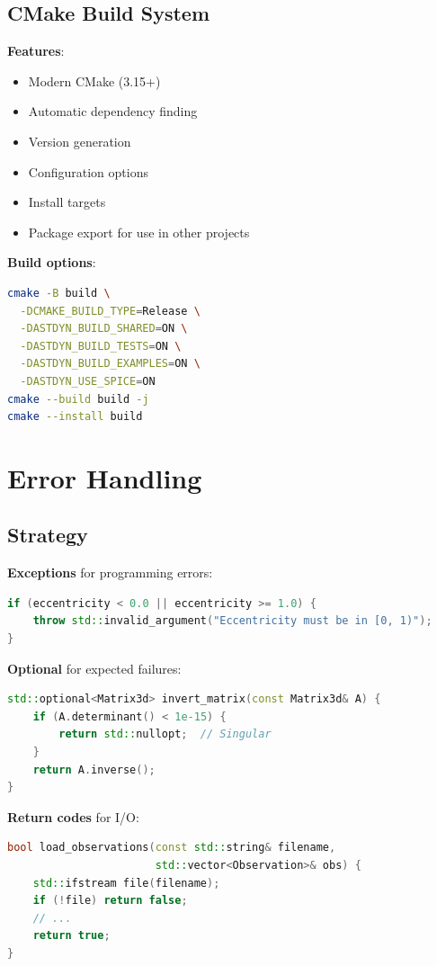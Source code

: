 \subsection{CMake Build System}

\textbf{Features}:
\begin{itemize}
    \item Modern CMake (3.15+)
    \item Automatic dependency finding
    \item Version generation
    \item Configuration options
    \item Install targets
    \item Package export for use in other projects
\end{itemize}

\textbf{Build options}:
\begin{lstlisting}[language=bash]
cmake -B build \
  -DCMAKE_BUILD_TYPE=Release \
  -DASTDYN_BUILD_SHARED=ON \
  -DASTDYN_BUILD_TESTS=ON \
  -DASTDYN_BUILD_EXAMPLES=ON \
  -DASTDYN_USE_SPICE=ON
cmake --build build -j
cmake --install build
\end{lstlisting}

\section{Error Handling}

\subsection{Strategy}

\textbf{Exceptions} for programming errors:
\begin{lstlisting}[language=C++]
if (eccentricity < 0.0 || eccentricity >= 1.0) {
    throw std::invalid_argument("Eccentricity must be in [0, 1)");
}
\end{lstlisting}

\textbf{Optional} for expected failures:
\begin{lstlisting}[language=C++]
std::optional<Matrix3d> invert_matrix(const Matrix3d& A) {
    if (A.determinant() < 1e-15) {
        return std::nullopt;  // Singular
    }
    return A.inverse();
}
\end{lstlisting}

\textbf{Return codes} for I/O:
\begin{lstlisting}[language=C++]
bool load_observations(const std::string& filename,
                       std::vector<Observation>& obs) {
    std::ifstream file(filename);
    if (!file) return false;
    // ...
    return true;
}
\end{lstlisting}

